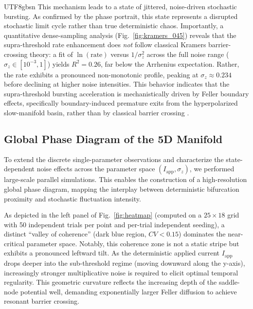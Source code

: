 ﻿\documentclass[reprint, amsmath, amssymb, aps, pre]{revtex4-2}
\begin{document}
\begin{CJK*}{UTF8}{gbsn}
This mechanism leads to a state of jittered, noise-driven stochastic bursting. As confirmed by the phase portrait, this state represents a disrupted stochastic limit cycle rather than true deterministic chaos. Importantly, a quantitative dense-sampling analysis (Fig.~\ref{fig:kramers_045}) reveals that the supra-threshold rate enhancement does \textit{not} follow classical Kramers barrier-crossing theory: a fit of $\ln(\text{rate})$ versus $1/\sigma_z^2$ across the full noise range ($\sigma_z \in [10^{-3}, 1]$) yields $R^2 = 0.26$, far below the Arrhenius expectation. Rather, the rate exhibits a pronounced non-monotonic profile, peaking at $\sigma_z \approx 0.234$ before declining at higher noise intensities. This behavior indicates that the supra-threshold bursting acceleration is mechanistically driven by Feller boundary effects, specifically boundary-induced premature exits from the hyperpolarized slow-manifold basin, rather than by classical barrier crossing \cite{hanggi1990reaction}.

\subsection{Global Phase Diagram of the 5D Manifold}

To extend the discrete single-parameter observations and characterize the state-dependent noise effects across the parameter space $(I_{\mathrm{app}}, \sigma_z)$, we performed large-scale parallel simulations. This enables the construction of a high-resolution global phase diagram, mapping the interplay between deterministic bifurcation proximity and stochastic fluctuation intensity.

As depicted in the left panel of Fig.~\ref{fig:heatmap} (computed on a $25 \times 18$ grid with 50 independent trials per point and per-trial independent seeding), a distinct ``valley of coherence'' (dark blue region, $CV < 0.15$) dominates the near-critical parameter space. Notably, this coherence zone is not a static stripe but exhibits a pronounced leftward tilt. As the deterministic applied current $I_{\mathrm{app}}$ drops deeper into the sub-threshold regime (moving downward along the y-axis), increasingly stronger multiplicative noise is required to elicit optimal temporal regularity. This geometric curvature reflects the increasing depth of the saddle-node potential well, demanding exponentially larger Feller diffusion to achieve resonant barrier crossing. 


\end{CJK*}
\end{document}
